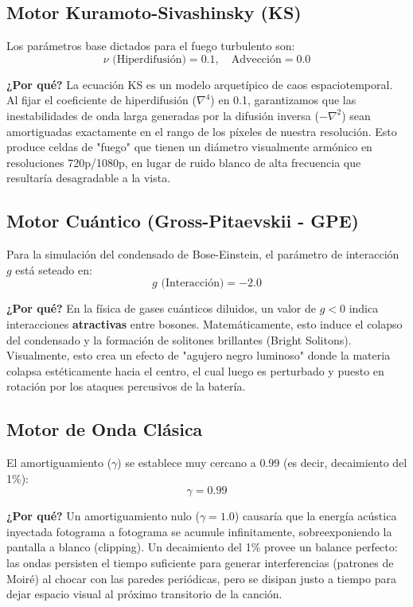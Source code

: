 \documentclass[12pt, openany]{book}
\begin{document}
\subsection{Motor Kuramoto-Sivashinsky (KS)}
Los parámetros base dictados para el fuego turbulento son:
\begin{equation}
\nu \text{ (Hiperdifusión)} = 0.1, \quad \text{Advección} = 0.0
\end{equation}

\textbf{¿Por qué?} La ecuación KS es un modelo arquetípico de caos espaciotemporal. Al fijar el coeficiente de hiperdifusión ($\nabla^4$) en 0.1, garantizamos que las inestabilidades de onda larga generadas por la difusión inversa ($-\nabla^2$) sean amortiguadas exactamente en el rango de los píxeles de nuestra resolución. Esto produce celdas de "fuego" que tienen un diámetro visualmente armónico en resoluciones 720p/1080p, en lugar de ruido blanco de alta frecuencia que resultaría desagradable a la vista.

\subsection{Motor Cuántico (Gross-Pitaevskii - GPE)}
Para la simulación del condensado de Bose-Einstein, el parámetro de interacción $g$ está seteado en:
\begin{equation}
g \text{ (Interacción)} = -2.0
\end{equation}

\textbf{¿Por qué?} En la física de gases cuánticos diluidos, un valor de $g < 0$ indica interacciones \textbf{atractivas} entre bosones. Matemáticamente, esto induce el colapso del condensado y la formación de solitones brillantes (Bright Solitons). Visualmente, esto crea un efecto de "agujero negro luminoso" donde la materia colapsa estéticamente hacia el centro, el cual luego es perturbado y puesto en rotación por los ataques percusivos de la batería.

\subsection{Motor de Onda Clásica}
El amortiguamiento ($\gamma$) se establece muy cercano a $0.99$ (es decir, decaimiento del 1\%):
\begin{equation}
\gamma = 0.99
\end{equation}

\textbf{¿Por qué?} Un amortiguamiento nulo ($\gamma = 1.0$) causaría que la energía acústica inyectada fotograma a fotograma se acumule infinitamente, sobreexponiendo la pantalla a blanco (clipping). Un decaimiento del 1\% provee un balance perfecto: las ondas persisten el tiempo suficiente para generar interferencias (patrones de Moiré) al chocar con las paredes periódicas, pero se disipan justo a tiempo para dejar espacio visual al próximo transitorio de la canción.
\end{document}
